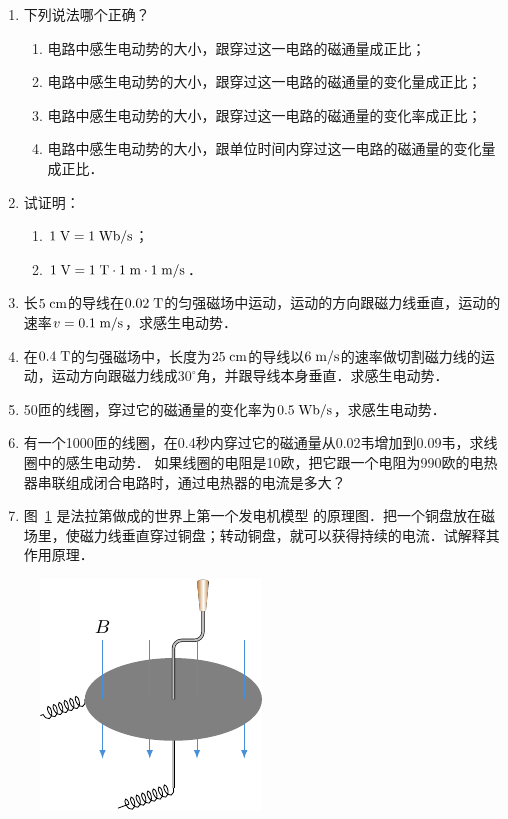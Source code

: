 \begin{enumerate}
    \item 下列说法哪个正确？
    \begin{enumerate}
        \item 电路中感生电动势的大小，跟穿过这一电路的磁通量成正比；
        \item 电路中感生电动势的大小，跟穿过这一电路的磁通量的变化量成正比；
        \item 电路中感生电动势的大小，跟穿过这一电路的磁通量的变化率成正比；
        \item 电路中感生电动势的大小，跟单位时间内穿过这一电路的磁通量的变化量成正比．
    \end{enumerate}
\item 试证明：
\begin{enumerate}
	\item
	$1\;\text{V}=1 \;\text{Wb}/\text{s}$；
	\item
	$1\;\text{V}=1\;\text{T}\cdot 1\;\text{m}\cdot 1\;\text{m}/\text{s}$．
	
\end{enumerate}

\item  长$ 5\;\text{cm} $的导线在$ 0.02\;\text{T} $的匀强磁场中运动，运动的方向跟磁力线垂直，运动的速率$v=0.1\;\text{m}/\text{s}$，求感生电动势．
\item 在$ 0.4\;\text{T} $的匀强磁场中，长度为$ 25\;\text{cm} $的导线以$6\;\text{m}/\text{s}$的速率做切割磁力线的运动，运动方向跟磁力线成$30^{\circ}$角，并跟导线本身垂直．求感生电动势．
\item 50匝的线圈，穿过它的磁通量的变化率为$0.5\;\text{Wb}/\text{s}$，求感生电动势．
\item 有一个1000匝的线圈，在0.4秒内穿过它的磁通量从0.02韦增加到0.09韦，求线圈中的感生电动势．
如果线圈的电阻是10欧，把它跟一个电阻为990欧的电热器串联组成闭合电路时，通过电热器的电流是多大？
\item 图~\ref{fig_C_2-23} 是法拉第做成的世界上第一个发电机模型
的原理图．把一个铜盘放在磁场里，使磁力线垂直穿过铜盘；转动铜盘，就可以获得持续的电流．试解释其作用原理．
\end{enumerate}

\begin{figure}[htbp]
    \centering
    \includegraphics{fig/C/2-23.pdf}
    \caption{}\label{fig_C_2-23}
\end{figure}

